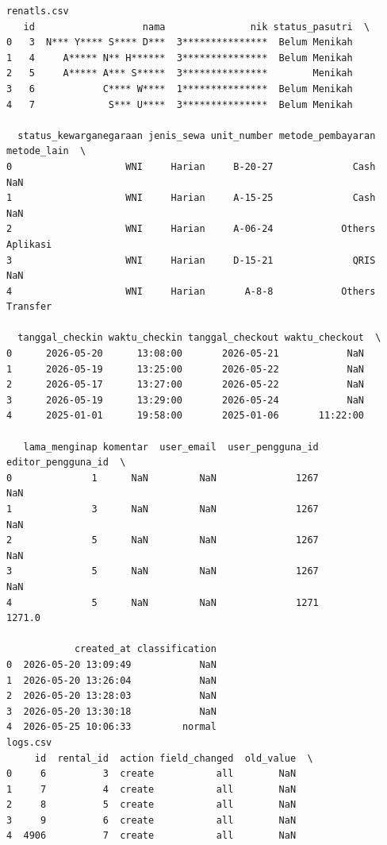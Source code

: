 \begin{lstlisting}[caption={Output 20}]
renatls.csv
   id                   nama               nik status_pasutri  \
0   3  N*** Y**** S**** D***  3***************  Belum Menikah   
1   4     A***** N** H******  3***************  Belum Menikah   
2   5     A***** A*** S*****  3***************        Menikah   
3   6            C**** W****  1***************  Belum Menikah   
4   7             S*** U****  3***************  Belum Menikah   

  status_kewarganegaraan jenis_sewa unit_number metode_pembayaran metode_lain  \
0                    WNI     Harian     B-20-27              Cash         NaN   
1                    WNI     Harian     A-15-25              Cash         NaN   
2                    WNI     Harian     A-06-24            Others    Aplikasi   
3                    WNI     Harian     D-15-21              QRIS         NaN   
4                    WNI     Harian       A-8-8            Others    Transfer   

  tanggal_checkin waktu_checkin tanggal_checkout waktu_checkout  \
0      2026-05-20      13:08:00       2026-05-21            NaN   
1      2026-05-19      13:25:00       2026-05-22            NaN   
2      2026-05-17      13:27:00       2026-05-22            NaN   
3      2026-05-19      13:29:00       2026-05-24            NaN   
4      2025-01-01      19:58:00       2025-01-06       11:22:00   

   lama_menginap komentar  user_email  user_pengguna_id  editor_pengguna_id  \
0              1      NaN         NaN              1267                 NaN   
1              3      NaN         NaN              1267                 NaN   
2              5      NaN         NaN              1267                 NaN   
3              5      NaN         NaN              1267                 NaN   
4              5      NaN         NaN              1271              1271.0   

            created_at classification  
0  2026-05-20 13:09:49            NaN  
1  2026-05-20 13:26:04            NaN  
2  2026-05-20 13:28:03            NaN  
3  2026-05-20 13:30:18            NaN  
4  2026-05-25 10:06:33         normal  
logs.csv
     id  rental_id  action field_changed  old_value  \
0     6          3  create           all        NaN   
1     7          4  create           all        NaN   
2     8          5  create           all        NaN   
3     9          6  create           all        NaN   
4  4906          7  create           all        NaN   


\end{lstlisting}
